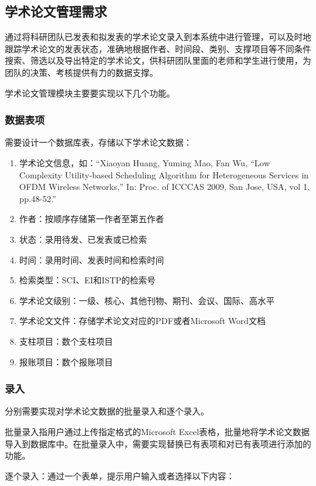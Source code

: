 \subsection{学术论文管理需求}

通过将科研团队已发表和拟发表的学术论文录入到本系统中进行管理，可以及时地跟踪学术论文的发表状态，准确地根据作者、时间段、类别、支撑项目等不同条件搜索、筛选以及导出特定的学术论文，供科研团队里面的老师和学生进行使用，为团队的决策、考核提供有力的数据支撑。

学术论文管理模块主要要实现以下几个功能。

\subsubsection{数据表项}
需要设计一个数据库表，存储以下学术论文数据：
\begin{enumerate}
\item 学术论文信息，如：“Xiaoyan Huang, Yuming Mao, Fan Wu, ``Low Complexity Utility-based Scheduling Algorithm for Heterogeneous Services in OFDM Wireless Networks,'' In: Proc. of ICCCAS 2009, San Jose, USA, vol 1, pp.48-52.”
\item 作者：按顺序存储第一作者至第五作者
\item 状态：录用待发、已发表或已检索
\item 时间：录用时间、发表时间和检索时间
\item 检索类型：SCI、EI和ISTP的检索号
\item 学术论文级别：一级、核心、其他刊物、期刊、会议、国际、高水平
\item 学术论文文件：存储学术论文对应的PDF或者Microsoft Word文档
\item 支柱项目：数个支柱项目
\item 报账项目：数个报账项目
\end{enumerate}

\subsubsection{录入}
分别需要实现对学术论文数据的批量录入和逐个录入。

批量录入指用户通过上传指定格式的Microsoft Excel表格，批量地将学术论文数据导入到数据库中。在批量录入中，需要实现替换已有表项和对已有表项进行添加的功能。

逐个录入：通过一个表单，提示用户输入或者选择以下内容：

